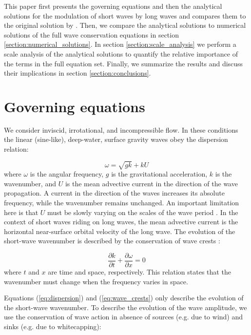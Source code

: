 \documentclass[lineno]{jfm}
\begin{document}
This paper first presents the governing equations and then the analytical
solutions for the modulation of short waves by long waves and compares them to
the original solution by \citet{longuet1960changes}.
Then, we compare the analytical solutions to numerical solutions of the full
wave conservation equations in section \ref{section:numerical_solutions}.
In section \ref{section:scale_analysis} we perform a scale analysis of the
analytical solutions to quantify the relative importance of the terms in the
full equation set.
Finally, we summarize the results and discuss their implications in section
\ref{section:conclusions}.

\section{Governing equations}
\label{section:governing_equations}

We consider inviscid, irrotational, and incompressible flow.
In these conditions the linear (sine-like), deep-water, surface gravity waves
obey the dispersion relation:

\begin{equation}
\label{eq:dispersion}
\omega = \sqrt{gk} + k U
\end{equation}
where $\omega$ is the angular frequency, $g$ is the gravitational acceleration,
$k$ is the wavenumber, and $U$ is the mean advective current in the direction
of the wave propagation.
A current in the direction of the waves increases its absolute frequency,
while the wavenumber remains unchanged.
An important limitation here is that $U$ must be slowly varying on the scales of
the wave period \citep{bretherton1968wavetrains}.
In the context of short waves riding on long waves, the mean advective current
is the horizontal near-surface orbital velocity of the long wave.
The evolution of the short-wave wavenumber is described by the conservation of
wave crests \citep{phillips1981dispersion}:

\begin{equation}
\label{eq:wave_crests}
\dfrac{\partial k}{\partial t}
+ \dfrac{\partial \omega}{\partial x}
= 0
\end{equation}
where $t$ and $x$ are time and space, respectively.
This relation states that the wavenumber must change when the frequency varies
in space.

Equations (\ref{eq:dispersion}) and (\ref{eq:wave_crests}) only describe the
evolution of the short-wave wavenumber.
To describe the evolution of the wave amplitude, we use the conservation of wave
action in absence of sources (e.g. due to wind) and sinks (e.g. due to whitecapping):
\end{document}
